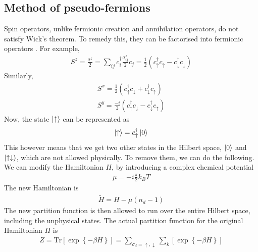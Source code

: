 \documentclass[twoside]{report}
\numberwithin{equation}{section}
\begin{document}
\subsection{Method of pseudo-fermions}
Spin operators, unlike fermionic creation and annihilation operators,  do not satisfy Wick's theorem.
To remedy this, they can be factorised into fermionic operators \cite{abrikosov}.
For example,
\begin{equation}\begin{aligned}
	S^z = \frac{\sigma^z}{2} = \sum_{ij} c^\dagger_i \frac{\sigma^z_{ij}}{2} c_j = \frac{1}{2}\left(c^\dagger_\uparrow c_\uparrow - c^\dagger_\downarrow c_\downarrow\right)
\end{aligned}\end{equation}
Similarly,
\begin{equation}\begin{aligned}
	S^x = \frac{1}{2}\left(c^\dagger_\uparrow c_\downarrow + c^\dagger_\downarrow c_\uparrow\right)\\
	S^y = \frac{-i}{2}\left(c^\dagger_\uparrow c_\downarrow - c^\dagger_\downarrow c_\uparrow\right)
\end{aligned}\end{equation}
Now, the state \(\ket{\uparrow}\) can be represented as
\begin{equation}\begin{aligned}
\ket{\uparrow} = c^\dagger_\uparrow \ket{0}
\end{aligned}\end{equation}
This however means that we get two other states in the Hilbert space, \(\ket{0}\) and \(\ket{\uparrow\downarrow}\), which are not allowed physically.
To remove them, we can do the following.
We can modify the Hamiltonian \(H\), by introducing a complex chemical potential \cite{poppov}
\begin{equation}\begin{aligned}
\mu = -i\frac{\pi}{2}k_B T
\end{aligned}\end{equation}
The new Hamiltonian is
\begin{equation}\begin{aligned}
\widetilde H = H -\mu (n_d - 1)
\end{aligned}\end{equation}
The new partition function is then allowed to run over the entire Hilbert space, including the unphysical states.
The actual partition function for the original Hamiltonian \(H\) is
\begin{equation}\begin{aligned}
	Z = \text{Tr}\left[\exp\left\{-\beta H\right\}\right] = \sum_{\sigma_d = \uparrow,\downarrow}\sum_{k}\left[\exp\left\{-\beta H\right\}\right]
\end{aligned}\end{equation}
\end{document}
